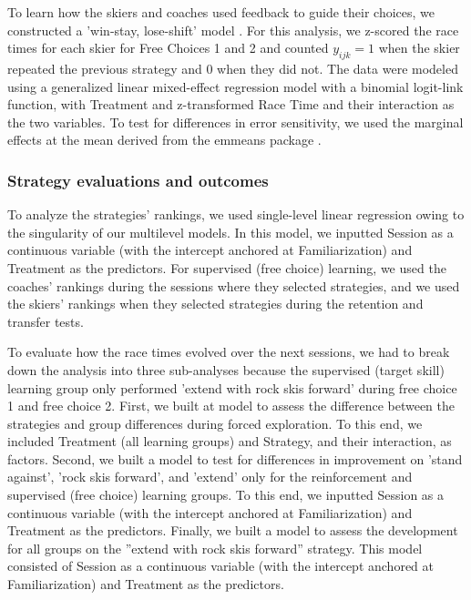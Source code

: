 \documentclass[pdflatex,sn-nature]{sn-jnl}%
\theoremstyle{thmstyleone}%
\theoremstyle{thmstyletwo}%
\theoremstyle{thmstylethree}%
\begin{document}
To learn how the skiers and coaches used feedback to guide their choices, we constructed a 'win-stay, lose-shift' model \cite{nowak_strategy_1993, worthy_comparison_2014, iyer_probing_2020}. For this analysis, we z-scored the race times for each skier for Free Choices 1 and 2 and counted \(y_{ijk}=1\) when the skier repeated the previous strategy and 0 when they did not. The data were modeled using a generalized linear mixed-effect regression model with a binomial logit-link function, with Treatment and z-transformed Race Time and their interaction as the two variables. To test for differences in error sensitivity, we used the marginal effects at the mean derived from the emmeans package \cite{lenth_emmeans_2023}.


\subsubsection{Strategy evaluations and outcomes}
To analyze the strategies' rankings, we used single-level linear regression owing to the singularity of our multilevel models. In this model, we inputted Session as a continuous variable (with the intercept anchored at Familiarization) and Treatment as the predictors. For supervised (free choice) learning, we used the coaches' rankings during the sessions where they selected strategies, and we used the skiers' rankings when they selected strategies during the retention and transfer tests.

To evaluate how the race times evolved over the next sessions, we had to break down the analysis into three sub-analyses because the supervised (target skill) learning group only performed ’extend with rock skis forward’ during free choice 1 and free choice 2. First, we built at model to assess the difference between the strategies and group differences during forced exploration. To this end, we included Treatment (all learning groups) and Strategy, and their interaction, as factors. Second, we built a model to test for differences in improvement on ’stand against’, ’rock skis forward’, and ’extend’ only for the reinforcement and supervised (free choice) learning groups. To this end, we inputted Session as a continuous variable (with the intercept anchored at Familiarization) and Treatment as the predictors. Finally, we built a model to assess the development for all groups on the ”extend with rock skis forward” strategy. This model consisted of Session as a continuous variable (with the intercept anchored at Familiarization) and Treatment as the predictors.
\end{document}
